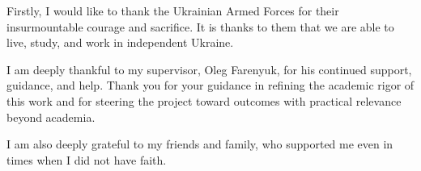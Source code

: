 \documentclass[
11pt, %
oneside, %
ukrainian,
english, %
singlespacing, %
headsepline, %
]{BachelorMasterThesis} %
\begin{document}
\begin{acknowledgements}
\addchaptertocentry{\acknowledgementname}
Firstly, I would like to thank the Ukrainian Armed Forces for their insurmountable courage and sacrifice. It is thanks to them that we are able to live, study, and work in independent Ukraine.

I am deeply thankful to my supervisor, Oleg Farenyuk, for his continued support, guidance, and help. Thank you for your guidance in refining the academic rigor of this work and for steering the project toward outcomes with practical relevance beyond academia.

I am also deeply grateful to my friends and family, who supported me even in times when I did not have faith.



\end{acknowledgements}


\tableofcontents %

\listoffigures %

\listoftables %

\end{document}
